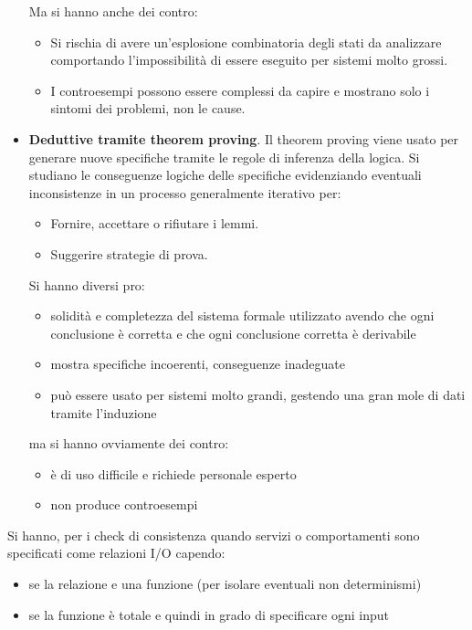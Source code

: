 \begin{itemize}
            Ma si hanno anche dei contro:
            \begin{itemize}
                  \item Si rischia di avere un'esplosione combinatoria degli stati da
                        analizzare comportando l'impossibilità di essere eseguito per
                        sistemi molto grossi.
                  \item I controesempi possono essere complessi da capire e mostrano
                        solo i sintomi dei problemi, non le cause.
            \end{itemize}
      \item \textbf{Deduttive tramite theorem proving}. Il theorem proving viene
            usato per generare nuove specifiche tramite le regole di inferenza della logica.
            Si studiano le conseguenze logiche delle specifiche evidenziando eventuali
            inconsistenze in un processo generalmente iterativo per:
            \begin{itemize}
                  \item Fornire, accettare o rifiutare i lemmi.
                  \item Suggerire strategie di prova.
            \end{itemize}
            Si hanno diversi pro:
            \begin{itemize}
                  \item solidità e completezza del sistema formale utilizzato avendo
                        che ogni conclusione è corretta e che ogni conclusione corretta è derivabile
                  \item mostra specifiche incoerenti, conseguenze inadeguate
                  \item può essere usato per sistemi molto grandi, gestendo una gran
                        mole di dati tramite l'induzione
            \end{itemize}
            ma si hanno ovviamente dei contro:
            \begin{itemize}
                  \item è di uso difficile e richiede personale esperto
                  \item non produce controesempi
            \end{itemize}
\end{itemize}
Si hanno, per i check di consistenza quando servizi o comportamenti sono specificati
come relazioni I/O capendo:
\begin{itemize}
      \item se la relazione e una funzione (per isolare eventuali non determinismi)
      \item se la funzione è totale e quindi in grado di specificare ogni input
\end{itemize}

